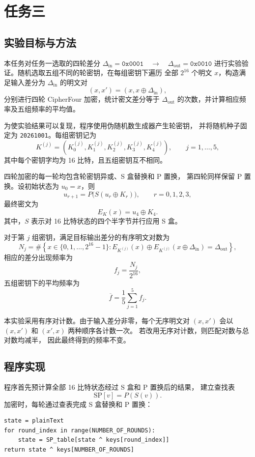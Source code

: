 \section{任务三}
\subsection{实验目标与方法}

本任务对任务一选取的四轮差分
    $\Delta_{\mathrm{in}} = \texttt{0x0001}
    \quad\longrightarrow\quad
    \Delta_{\mathrm{out}} = \texttt{0x0010}$
进行实验验证。随机选取五组不同的轮密钥，在每组密钥下遍历
全部 $2^{16}$ 个明文 $x$，构造满足输入差分为
$\Delta_{\mathrm{in}}$ 的明文对
\[
    (x,x')=(x,x\oplus\Delta_{\mathrm{in}}),
\]
分别进行四轮 CipherFour 加密，统计密文差分等于
$\Delta_{\mathrm{out}}$ 的次数，并计算相应频率及五组频率的平均值。

为使实验结果可以复现，程序使用伪随机数生成器产生轮密钥，
并将随机种子固定为 \texttt{20261001}。每组密钥记为
\[
    K^{(j)}=(K_0^{(j)},K_1^{(j)},K_2^{(j)},K_3^{(j)},K_4^{(j)}),
    \qquad j=1,\ldots,5,
\]
其中每个密钥字均为 16 比特，且五组密钥互不相同。

四轮加密的每一轮均包含轮密钥异或、S 盒替换和 P 置换，
第四轮同样保留 P 置换。设初始状态为 $u_0=x$，则
\[
    u_{r+1}=P\bigl(S(u_r\oplus K_r)\bigr),
    \qquad r=0,1,2,3,
\]
最终密文为
\[
    E_K(x)=u_4\oplus K_4.
\]
其中，$S$ 表示对 16 比特状态的四个半字节并行应用 S 盒。

对于第 $j$ 组密钥，满足目标输出差分的有序明文对数为
\[
    N_j =
    \#\left\{
        x\in\{0,1,\ldots,2^{16}-1\}:
        E_{K^{(j)}}(x)\oplus
        E_{K^{(j)}}(x\oplus\Delta_{\mathrm{in}})
        =\Delta_{\mathrm{out}}
    \right\},
\]
相应的差分出现频率为
\[
    f_j=\frac{N_j}{2^{16}},
\]
五组密钥下的平均频率为
\[
    \overline{f}=\frac{1}{5}\sum_{j=1}^{5}f_j.
\]

本实验采用有序对计数。由于输入差分非零，每个无序明文对
$(x,x')$ 会以 $(x,x')$ 和 $(x',x)$ 两种顺序各计数一次。
若改用无序对计数，则匹配对数与总对数均减半，
因此最终得到的频率不变。

\subsection{程序实现}

程序首先预计算全部 16 比特状态经过 S 盒和 P 置换后的结果，
建立查找表
\[
    \mathrm{SP}[v]=P(S(v)).
\]
加密时，每轮通过查表完成 S 盒替换和 P 置换：
\begin{lstlisting}
state = plainText
for round_index in range(NUMBER_OF_ROUNDS):
    state = SP_table[state ^ keys[round_index]]
return state ^ keys[NUMBER_OF_ROUNDS]
\end{lstlisting}

